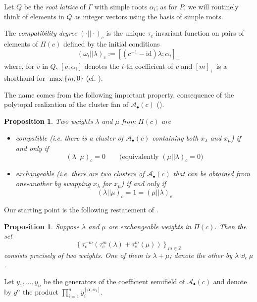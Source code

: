 \documentclass[pdftex]{sigma}
\numberwithin{equation}{section}
\numberwithin{figure}{section}
\newtheorem{Proposition}[Theorem]{Proposition}
{
  \theoremstyle{Definition}
  \newtheorem{Definition}[Theorem]{Definition}
  \newtheorem{Remark}[Theorem]{Remark}
}
\newcommand{\cA}{\mathcal{A}}
\newcommand{\ZZ}{\mathbb{Z}}
\newcommand{\id}{\mathrm{id}}
\begin{document}
  Let $Q$ be the \emph{root lattice} of $\Gamma$ with simple roots $\alpha_i$; as for $P$, we will routinely think of elements in $Q$ as integer vectors using the basis of simple roots.
  \begin{Definition}
    The \emph{compatibility degree} $(\cdot||\cdot)_c$ is the unique $\tau_c$-invariant function on pairs of elements of $\Pi(c)$ defined by the initial conditions
    \[
      (\omega_i||\lambda)_c
      :=
      \left[ (c^{-1}-\id)\lambda ; \alpha_i\right]_+
    \]
    where, for $v$ in $Q$, $[v;\alpha_i]$ denotes the $i$-th coefficient of $v$  and $[m]_+$ is a shorthand for $\max\{m, 0\}$ (cf. \cite[Proposition 5.1]{YZ08}).
  \end{Definition}
  The name comes from the following important property, consequence of the polytopal realization of the cluster fan of $\cA_\bullet(c)$ (\cite{CFZ02,Ste13}).
  \begin{Proposition}
    Two weights $\lambda$ and $\mu$ from $\Pi(c)$ are
    \begin{itemize}
      \item
        \emph{compatible} (i.e. there is a cluster of $\cA_\bullet(c)$ containing both $x_\lambda$ and $x_\mu$) if and only if
        \[
          (\lambda||\mu)_c = 0
          \quad \quad
          \text{(equivalently $(\mu||\lambda)_c=0$)}
        \]

      \item
        \emph{exchangeable} (i.e. there are two clusters of $\cA_\bullet(c)$ that can be obtained from one-another by swapping $x_\lambda$ for $x_\mu$) if and only if
        \[
          (\lambda||\mu)_c = 1 = (\mu||\lambda)_c
        \]
    \end{itemize}
  \end{Proposition}

  Our starting point is the following restatement of \cite[Proposition 5.1]{Ste13}.
  \begin{Proposition}
    Suppose $\lambda$ and $\mu$ are exchangeable weights in $\Pi(c)$.
    Then the set
    \[
      \left\{
        \tau_c^{-m}\left(\tau_c^m(\lambda)+\tau_c^m(\mu)\right)
      \right\}_{m\in\ZZ}
    \]
    consists precisely of two weights.
    One of them is $\lambda+\mu$; denote the other by $\lambda\uplus_c\mu$.
  \end{Proposition}

  Let $y_1,\dots,y_n$ be the generators of the coefficient semifield of $\cA_\bullet(c)$ and denote by $y^\alpha$ the product $\prod_{i=1}^n y_i^{[\alpha;\alpha_i]}$.
\end{document}
